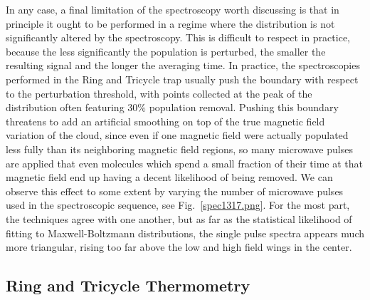 In any case, a final limitation of the spectroscopy worth discussing is that in principle it ought to be performed in a regime where the distribution is not significantly altered by the spectroscopy.
This is difficult to respect in practice, because the less significantly the population is perturbed, the smaller the resulting signal and the longer the averaging time.
In practice, the spectroscopies performed in the Ring and Tricycle trap usually push the boundary with respect to the perturbation threshold, with points collected at the peak of the distribution often featuring $30\%$ population removal.
Pushing this boundary threatens to add an artificial smoothing on top of the true magnetic field variation of the cloud, since even if one magnetic field were actually populated less fully than its neighboring magnetic field regions, so many microwave pulses are applied that even molecules which spend a small fraction of their time at that magnetic field end up having a decent likelihood of being removed.
We can observe this effect to some extent by varying the number of microwave pulses used in the spectroscopic sequence, see Fig.~\ref{spec1317.png}.
For the most part, the techniques agree with one another, but as far as the statistical likelihood of fitting to Maxwell-Boltzmann distributions, the single pulse spectra appears much more triangular, rising too far above the low and high field wings in the center.


\subsection{Ring and Tricycle Thermometry}

